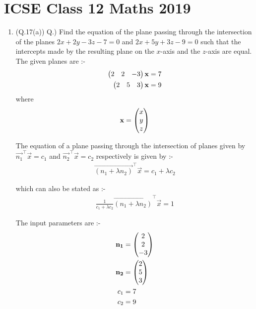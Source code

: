 \documentclass[journal,12pt,twocolumn]{IEEEtran}
\renewcommand\thesection{\arabic{section}}
\begin{document}
\section{ICSE Class 12 Maths 2019}
\begin{enumerate}[label=\thesection.\arabic*.,ref=\thesection.\theenumi]
\item (Q.17(a)) Q.) Find the equation of the plane passing through the intersection of the planes $2x + 2y - 3z - 7 = 0$ and $2x + 5y + 3z - 9 = 0$ such that the intercepts made by the resulting plane on the $x$-axis and the $z$-axis are equal.\\

\solution
The given planes are :-
\begin{align}
\begin{pmatrix}2 & 2 & -3\end{pmatrix}\mathbf{x}=7
\\
\begin{pmatrix}2 & 5 & 3\end{pmatrix}\mathbf{x}=9
\end{align}
where
\begin{align}
\mathbf{x} = \begin{pmatrix}x \\ y \\ z\end{pmatrix}
\end{align}

The equation of a plane passing through the intersection of planes given by $\vec{n_1}^{\top}\vec{x} = c_1$ and $\vec{n_2}^{\top}\vec{x} = c_2$ respectively is given by :-
\begin{align}
\vec{\left( n_1 + \lambda n_2 \right)}^{\top}\vec{x} = c_1 + \lambda c_2
\end{align}

which can also be stated as :-
\begin{align}
\frac{1}{c_1 + \lambda c_2} \vec{\left( n_1 + \lambda n_2 \right)}^{\top}\vec{x} = 1 \label{eq:eq1}
\end{align}

The input parameters are :-
\begin{align}
\mathbf{n_1} &= \begin{pmatrix}2 \\ 2 \\ -3\end{pmatrix} \label{eq:eq2}
\\
\mathbf{n_2} &= \begin{pmatrix}2 \\ 5 \\ 3\end{pmatrix} \label{eq:eq3}
\\
c_1 &= 7 \label{eq:eq4}
\\
c_2 &= 9 \label{eq:eq5}
\end{align}


\end{enumerate}
\end{document}
